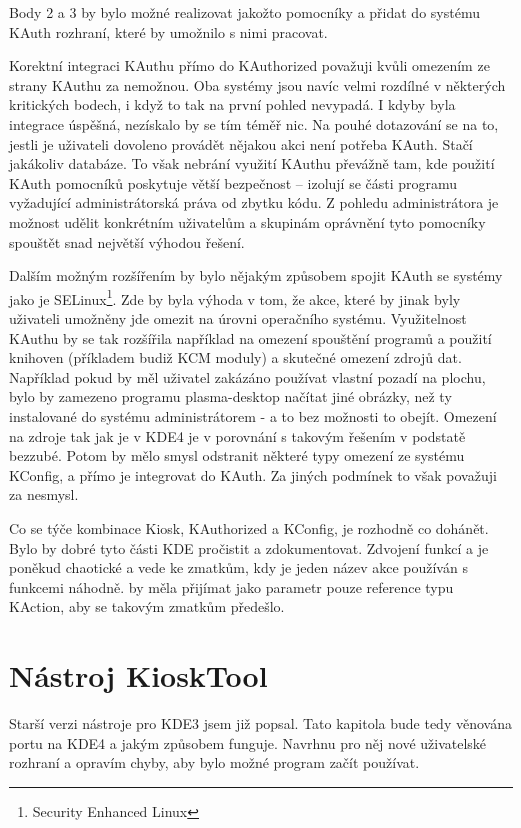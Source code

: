 {Body 2 a 3 by bylo možné realizovat jakožto pomocníky a přidat do systému KAuth rozhraní, které by umožnilo s nimi pracovat.

Korektní integraci KAuthu přímo do KAuthorized považuji kvůli omezením ze strany KAuthu za nemožnou. Oba systémy jsou navíc velmi rozdílné v některých kritických bodech, i když to tak na první pohled nevypadá. I kdyby byla integrace úspěšná, nezískalo by se tím téměř nic. Na pouhé dotazování se na to, jestli je uživateli dovoleno provádět nějakou akci není potřeba KAuth. Stačí jakákoliv databáze. To však nebrání využití KAuthu převážně tam, kde použití KAuth pomocníků poskytuje větší bezpečnost -- izolují se části programu vyžadující administrátorská práva od zbytku kódu. Z pohledu administrátora je možnost udělit konkrétním uživatelům a skupinám oprávnění tyto pomocníky spouštět snad největší výhodou řešení.

Dalším možným rozšířením by bylo nějakým způsobem spojit KAuth se systémy jako je SELinux\footnote{Security Enhanced Linux}. Zde by byla výhoda v tom, že akce, které by jinak byly uživateli umožněny jde omezit na úrovni operačního systému. Využitelnost KAuthu by se tak rozšířila například na omezení spouštění programů a použití knihoven (příkladem budiž KCM moduly) a skutečné omezení zdrojů dat. Například pokud by měl uživatel zakázáno používat vlastní pozadí na plochu, bylo by zamezeno programu plasma-desktop načítat jiné obrázky, než ty instalované do systému administrátorem - a to bez možnosti to obejít. Omezení na zdroje tak jak je v KDE4 je v porovnání s takovým řešením v podstatě bezzubé. Potom by mělo smysl odstranit některé typy omezení ze systému KConfig, a přímo je integrovat do KAuth. Za jiných podmínek to však považuji za nesmysl.

Co se týče kombinace Kiosk, KAuthorized a KConfig, je rozhodně co dohánět. Bylo by dobré tyto části KDE pročistit a zdokumentovat. Zdvojení funkcí  a  je poněkud chaotické a vede ke zmatkům, kdy je jeden název akce používán s funkcemi náhodně.  by měla přijímat jako parametr pouze reference typu KAction, aby se takovým zmatkům předešlo.

\chapter{Nástroj KioskTool}
Starší verzi nástroje pro KDE3 jsem již popsal. Tato kapitola bude tedy věnována portu na KDE4 a jakým způsobem funguje. Navrhnu pro něj nové uživatelské rozhraní a opravím chyby, aby bylo možné program začít používat.

}
